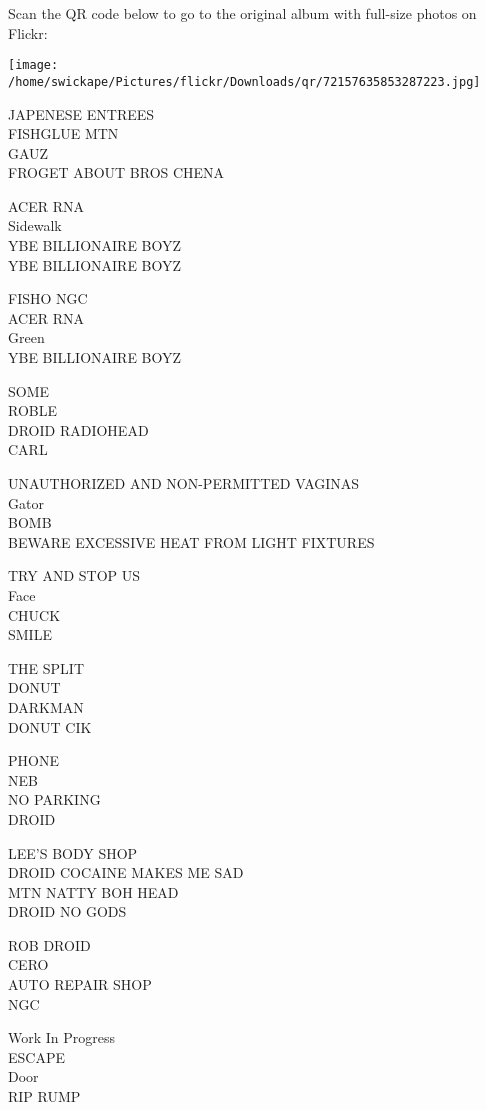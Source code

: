 \documentclass[10pt,letterpaper]{article}
\begin{document}
Scan the QR code below to go to the original album with full-size photos on Flickr:

\texttt{[image: /home/swickape/Pictures/flickr/Downloads/qr/72157635853287223.jpg]}


JAPENESE ENTREES\\
FISHGLUE MTN\\
GAUZ\\
FROGET ABOUT BROS CHENA

ACER RNA\\
Sidewalk\\
YBE BILLIONAIRE BOYZ\\
YBE BILLIONAIRE BOYZ

FISHO NGC\\
ACER RNA\\
Green\\
YBE BILLIONAIRE BOYZ

SOME\\
ROBLE\\
DROID RADIOHEAD\\
CARL

UNAUTHORIZED AND NON{-}PERMITTED VAGINAS\\
Gator\\
BOMB\\
BEWARE EXCESSIVE HEAT FROM LIGHT FIXTURES

TRY AND STOP US\\
Face\\
CHUCK\\
SMILE

THE SPLIT\\
DONUT\\
DARKMAN\\
DONUT CIK

PHONE\\
NEB\\
NO PARKING\\
DROID

LEE'S BODY SHOP\\
DROID COCAINE MAKES ME SAD\\
MTN NATTY BOH HEAD\\
DROID NO GODS

ROB DROID\\
CERO\\
AUTO REPAIR SHOP\\
NGC

Work In Progress\\
ESCAPE\\
Door\\
RIP RUMP
\end{document}
